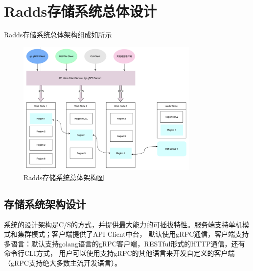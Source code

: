 \section{Radds存储系统总体设计}

	Radds存储系统总体架构组成如所示
	
	\begin{figure}[H]
		\centering
		\includegraphics[width=0.80\textwidth]{images/radds_system_arch.jpeg}
		\caption{Radds存储系统总体架构图}
		\label{overall_structure}
	\end{figure}
	
	\subsection{存储系统架构设计}

		系统的设计架构是C/S的方式，并提供最大能力的可插拔特性。服务端支持单机模式和集群模式；客户端提供了API Client中台，
		默认使用gRPC通信，客户端支持多语言：默认支持golang语言的gRPC客户端，RESTful形式的HTTP通信，还有命令行CLI方式，
		用户可以使用支持gRPC的其他语言来开发自定义的客户端（gRPC支持绝大多数主流开发语言）。
		
